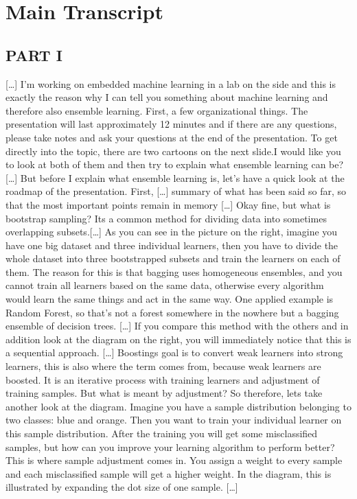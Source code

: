 \chapter{Main Transcript}

\section{PART I}

[\dots] I'm working on embedded machine learning in a lab on the side and this is exactly the reason why I can tell you something about machine learning and therefore also ensemble learning. First, a few organizational things. The presentation will last approximately 12 minutes and if there are any questions, please take notes and ask your questions at the end of the presentation. To get directly into the topic, there are two cartoons on the next slide.I would like you to look at both of them and then try to explain what ensemble learning can be? [\dots] But before I explain what ensemble learning is, let's have a quick look at the roadmap of the presentation. First, [\dots] summary of what has been said so far, so that the most important points remain in memory [\dots] Okay fine, but what is bootstrap sampling? Its a common method for dividing data into sometimes overlapping subsets.[\dots] As you can see in the picture on the right, imagine you have one big dataset and three individual learners, then you have to divide the whole dataset into three bootstrapped subsets and train the learners on each of them. The reason for this is that bagging uses homogeneous ensembles, and you cannot train all learners based on the same data, otherwise every algorithm would learn the same things and act in the same way. One applied example is Random Forest, so that's not a forest somewhere in the nowhere but a bagging ensemble of decision trees. [\dots] If you compare this method with the others and in addition look at the diagram on the right, you will immediately notice that this is a sequential approach. [\dots] Boostings goal is to convert weak learners into strong learners, this is also where the term comes from, because weak learners are boosted.  It is an iterative process with training learners and adjustment of training samples. But what is meant by adjustment? So therefore, lets take another look at the diagram. Imagine you have a sample distribution belonging to two classes: blue and orange. Then you want to train your individual learner on this sample distribution. After the training you will get some misclassified samples, but how can you improve your learning algorithm to perform better? This is where sample adjustment comes in. You assign a weight to every sample and each misclassified sample will get a higher weight. In the diagram, this is illustrated by expanding the dot size of one sample. [\dots]


